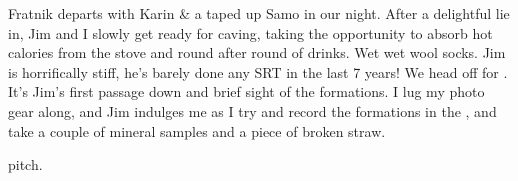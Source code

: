 Fratnik departs with Karin \& a taped up Samo in our night. After a
delightful lie in, Jim and I slowly get ready for caving, taking the
opportunity to absorb hot calories from the stove and round after round
of drinks. Wet wet wool socks. Jim is horrifically stiff, he's barely
done any SRT in the last 7 years! We head off for .
It's Jim's first passage down  and brief sight of the
formations. I lug my photo gear along, and Jim indulges me as I try and
record the formations in the , and take a couple of mineral
samples and a piece of broken straw.


\begin{marginfigure}
\checkoddpage \ifoddpage \forcerectofloat \else \forceversofloat \fi
\centering
 \caption{ pitch. }
 \label{longwater}
\end{marginfigure}


